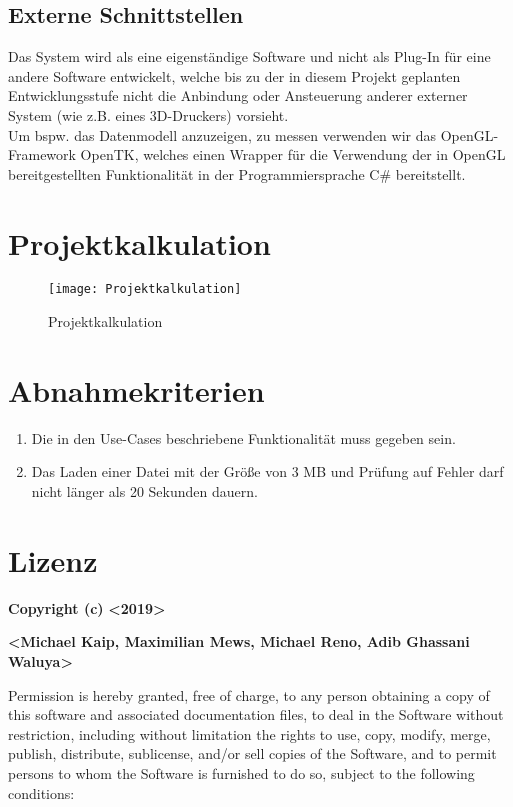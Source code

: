 \documentclass[fontsize=10pt, listof = totoc]{scrartcl}
\begin{document}
\subsection{Externe Schnittstellen}
Das System wird als eine eigenständige Software und nicht als Plug-In für eine andere Software entwickelt, welche bis zu der in diesem Projekt geplanten Entwicklungsstufe nicht die Anbindung oder Ansteuerung anderer externer System (wie z.B. eines 3D-Druckers) vorsieht.\\

Um bspw. das Datenmodell anzuzeigen, zu messen verwenden wir das OpenGL-Framework OpenTK, welches einen Wrapper für die Verwendung der in OpenGL bereitgestellten Funktionalität in der Programmiersprache C\# bereitstellt.

\section{Projektkalkulation}
\begin{figure}[H]
\centering
\texttt{[image: Projektkalkulation]}
\caption{Projektkalkulation}
\end{figure}

\section{Abnahmekriterien}
\begin{enumerate}
\item Die in den Use-Cases beschriebene Funktionalität muss gegeben sein.
\item Das Laden einer Datei mit der Größe von 3 MB und Prüfung auf Fehler darf nicht länger als 20 Sekunden dauern.
\end{enumerate}
\newpage
\section{Lizenz}
\begin{center}
\textbf{Copyright (c)} \textbf{<2019>}
\end{center}
\begin{center}
\textbf{<Michael Kaip, Maximilian Mews, Michael Reno, Adib Ghassani Waluya>}
\end{center}

Permission is hereby granted, free of charge, to any person obtaining a copy of this software and associated documentation files, to deal in the Software without restriction, including without limitation the rights to use, copy, modify, merge, publish, distribute, sublicense, and/or sell copies of the Software, and to permit persons to whom the Software is furnished to do so, subject to the following conditions:\\
\end{document}
